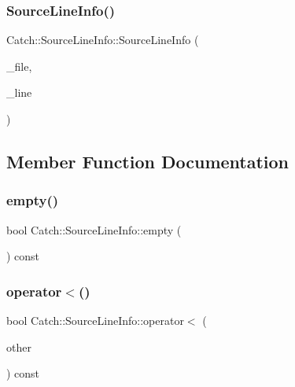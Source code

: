 \mbox{\label{struct_catch_1_1_source_line_info_a6218cb890337d37f708ea94063958940}} 
\subsubsection{Source\+Line\+Info()\hspace{0.1cm}{\footnotesize\ttfamily [2/2]}}
{\footnotesize\ttfamily Catch\+::\+Source\+Line\+Info\+::\+Source\+Line\+Info (\begin{DoxyParamCaption}\item[{char const $\ast$}]{\+\_\+file,  }\item[{std\+::size\+\_\+t}]{\+\_\+line }\end{DoxyParamCaption})}



\subsection{Member Function Documentation}
\mbox{\label{struct_catch_1_1_source_line_info_a05ab6444e9de7e9c3e76d8aa00093c3a}} 
\subsubsection{empty()}
{\footnotesize\ttfamily bool Catch\+::\+Source\+Line\+Info\+::empty (\begin{DoxyParamCaption}{ }\end{DoxyParamCaption}) const}

\mbox{\label{struct_catch_1_1_source_line_info_a8b99a0d7b1553d8c2298c694db924be3}} 
\subsubsection{operator$<$()}
{\footnotesize\ttfamily bool Catch\+::\+Source\+Line\+Info\+::operator$<$ (\begin{DoxyParamCaption}\item[{\textbf{ Source\+Line\+Info} const \&}]{other }\end{DoxyParamCaption}) const}

